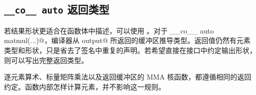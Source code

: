 \subsection*{\texttt{\_\_co\_\_ auto} 返回类型}

若结果形状更适合在函数体中描述，可以使用 \co@auto@。对于 \co@__co__ auto matmul(...)@，编译器从 \co@return output@ 所返回的缓冲区推导类型。返回值仍然有元素类型和形状，\co@auto@ 只是省去了签名中重复的声明。若希望直接在接口中约定输出形状，则可以写出完整返回类型。

逐元素算术、标量矩阵乘法以及返回缓冲区的 MMA 核函数，都遵循相同的返回约定。函数内部怎样计算元素，并不影响这一规则。
